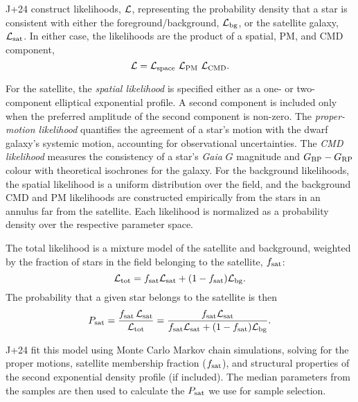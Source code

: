 J+24 construct likelihoods, \({\cal L}\), representing the probability
density that a star is consistent with either the foreground/background,
\({\cal L}_{\rm bg}\), or the satellite galaxy, \({\cal L}_{\rm sat}\).
In either case, the likelihoods are the product of a spatial, PM, and
CMD component, \begin{equation}{
{\cal L} = {\cal L}_{\rm space}\ {\cal L}_{\rm PM}\ {\cal L}_{\rm CMD}.
}\end{equation}

For the satellite, the \emph{spatial likelihood} is specified either as
a one- or two-component elliptical exponential profile. A second
component is included only when the preferred amplitude of the second
component is non-zero. The \emph{proper-motion likelihood} quantifies
the agreement of a star's motion with the dwarf galaxy's systemic
motion, accounting for observational uncertainties. The \emph{CMD
likelihood} measures the consistency of a star's \emph{Gaia} \(G\)
magnitude and \(G_{\rm BP}- G_{\rm RP}\) colour with theoretical
isochrones for the galaxy. For the background likelihoods, the spatial
likelihood is a uniform distribution over the field, and the background
CMD and PM likelihoods are constructed empirically from the stars in an
annulus far from the satellite. Each likelihood is normalized as a
probability density over the respective parameter space.

The total likelihood is a mixture model of the satellite and background,
weighted by the fraction of stars in the field belonging to the
satellite, \(f_{\rm sat}\): \begin{equation}{
{\cal L}_{\rm tot} = f_{\rm sat}{\cal L}_{\rm sat} + (1-f_{\rm sat}){\cal L}_{\rm bg}.
}\end{equation} The probability that a given star belongs to the
satellite is then \begin{equation}{
P_{\rm sat} = 
\frac{f_{\rm sat}\,{\cal L}_{\rm sat}}{{\cal L}_{\rm tot}}
= \frac{f_{\rm sat}{\cal L}_{\rm sat}}{f_{\rm sat}{\cal L}_{\rm sat} + (1-f_{\rm sat}){\cal L}_{\rm bg}}.
}\end{equation}

J+24 fit this model using Monte Carlo Markov chain simulations, solving
for the proper motions, satellite membership fraction (\(f_{\rm sat}\)),
and structural properties of the second exponential density profile (if
included). The median parameters from the samples are then used to
calculate the \(P_{\rm sat}\) we use for sample selection.

